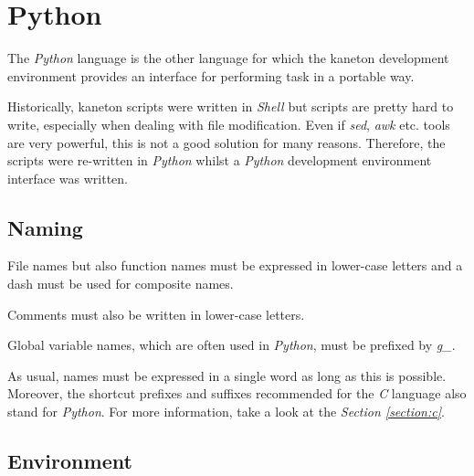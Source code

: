 %
%
%
%
%
%

%
%

\section{Python}
\label{section:python}

The \textit{Python} language is the other language for which the kaneton
development environment provides an interface for performing task in
a portable way.

Historically, kaneton scripts were written in \textit{Shell} but scripts
are pretty hard to write, especially when dealing with file modification.
Even if \textit{sed}, \textit{awk} etc. tools are very powerful, this
is not a good solution for many reasons. Therefore, the scripts were
re-written in \textit{Python} whilst a \textit{Python} development environment
interface was written.

%
%

\subsection{Naming}

File names but also function names must be expressed in lower-case letters
and a dash must be used for composite names.

Comments must also be written in lower-case letters.

Global variable names, which are often used in \textit{Python}, must be
prefixed by \textit{g\_}.

As usual, names must be expressed in a single word as long as this is possible.
Moreover, the shortcut prefixes and suffixes recommended for the \textit{C}
language also stand for \textit{Python}. For more information, take a look
at the \textit{Section \ref{section:c}}.


\subsection{Environment}

